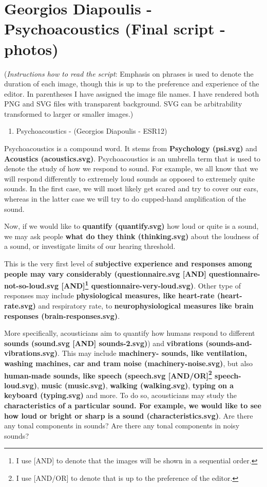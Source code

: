 \documentclass[12pt, hidelinks, doc]{article}
\date{}
\title{}
\begin{document}
\section*{Georgios Diapoulis - Psychoacoustics (Final script - photos)}
\label{sec:org3e4729c}
(\emph{Instructions how to read the script}:  Emphasis on phrases is used to denote the duration of each image, though this is up to the preference and experience of the editor.  In parentheses I have assigned the image file names.  I have rendered both PNG and SVG files with transparent background.  SVG can be arbitrability transformed to larger or smaller images.)



\begin{enumerate}
\item Psychoacoustics - (Georgios Diapoulis - ESR12)
\end{enumerate}


Psychoacoustics is a compound word.  It stems from \textbf{Psychology (psi.svg)} and \textbf{Acoustics (acoustics.svg)}.  Psychoacoustics is an umbrella term that is used to denote the study of how we respond to sound.  For example, we all know that we will respond differently to extremely loud sounds as opposed to extremely quite sounds.  In the first case, we will most likely get scared and try to cover our ears, whereas in the latter case we will try to do cupped-hand amplification of the sound.

Now, if we would like to \textbf{quantify (quantify.svg)} how loud or quite is a sound, we may ask people \textbf{what do they think (thinking.svg)} about the loudness of a sound, or investigate limits of our hearing threshold.

This is the very first level of \textbf{subjective experience and responses among people may vary considerably (questionnaire.svg [AND] questionnaire-not-so-loud.svg [AND]\footnote{I use [AND] to denote that the images will be shown in a sequential order.} questionnaire-very-loud.svg)}.
Other type of responses may include \textbf{physiological measures, like heart-rate (heart-rate.svg)} and respiratory rate, to \textbf{neurophysiological measures like brain responses (brain-responses.svg)}.

More specifically, acousticians aim to quantify how humans respond to different \textbf{sounds (sound.svg [AND] sounds-2.svg)}) and \textbf{vibrations (sounds-and-vibrations.svg)}.  This may include \textbf{machinery- sounds, like ventilation, washing machines, car and tram noise (machinery-noise.svg)}, but also \textbf{human-made sounds, like speech (speech.svg [AND/OR]\footnote{I use [AND/OR] to denote that is up to the preference of the editor.} speech-loud.svg)}, \textbf{music (music.svg)}, \textbf{walking (walking.svg)}, \textbf{typing on a keyboard (typing.svg)} and more. To do so, acousticians may study the \textbf{characteristics of a particular sound.  For example, we would like to see how loud or bright or sharp is a sound (characteristics.svg)}.  Are there any tonal components in sounds?  Are there any tonal components in noisy sounds?
\end{document}
